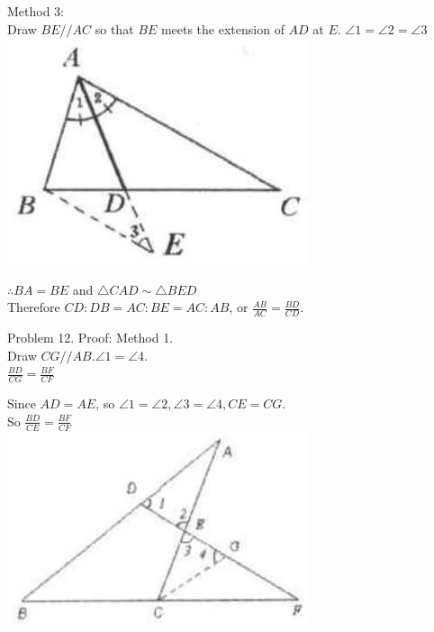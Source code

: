 \documentclass[10pt]{article}
\begin{document}
Method 3:\\
Draw \(B E / / A C\) so that \(B E\) meets the extension of \(A D\) at \(E\). \(\angle 1=\angle 2=\angle 3\)\\
\includegraphics[max width=\textwidth, center]{2025_04_17_97bc1f7e44d93c271a88g-136}


\(\therefore B A=B E\) and \(\triangle C A D \sim \triangle B E D\)\\
Therefore \(C D: D B=A C: B E=A C: A B\), or \(\frac{A B}{A C}=\frac{B D}{C D}\).

Problem 12. Proof:
Method 1.\\
Draw \(C G / / A B . \angle 1=\angle 4\).\\
\(\frac{B D}{C G}=\frac{B F}{C F}\)

Since \(A D=A E\), so \(\angle 1=\angle 2, \angle 3=\angle 4, C E=C G\).\\
So \(\frac{B D}{C E}=\frac{B F}{C F}\)\\
\includegraphics[max width=\textwidth, center]{2025_04_17_97bc1f7e44d93c271a88g-137(2)}
\end{document}
